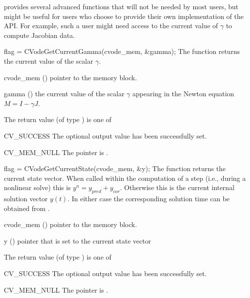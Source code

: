 {\cvode} provides several advanced functions that will not be needed by most
users, but might be useful for users who choose to provide their own
implementation of the  API. For example, such a user
might need access to the current value of $\gamma$ to compute Jacobian data.

{
  flag = CVodeGetCurrentGamma(cvode\_mem, \&gamma);
}
{
  The function  returns the current
  value of the scalar $\gamma$.
}
{
  \begin{args}
  \item[cvode\_mem] ()
    pointer to the {\cvode} memory block.
  \item[gamma] ()
      the current value of the scalar $\gamma$ appearing in the
      Newton equation $M = I - \gamma J$.
  \end{args}
}
{
  The return value  (of type ) is one of
  \begin{args}
  \item[CV\_SUCCESS]
    The optional output value has been successfully set.
  \item[CV\_MEM\_NULL]
    The  pointer is .
  \end{args}
}
{}
{
  flag = CVodeGetCurrentState(cvode\_mem, \&y);
}
{
  The function  returns the current state vector. When
  called within the computation of a step (i.e., during a nonlinear solve) this
  is $y^n = y_{pred} + y_{cor}$. Otherwise this is the current internal solution
  vector $y(t)$. In either case the corresponding solution time can be obtained
  from .
}
{
  \begin{args}
  \item[cvode\_mem] ()
    pointer to the {\cvode} memory block.
  \item[y] ()
    pointer that is set to the current state vector
  \end{args}
}
{
  The return value  (of type ) is one of
  \begin{args}
  \item[CV\_SUCCESS]
    The optional output value has been successfully set.
  \item[CV\_MEM\_NULL]
    The  pointer is .
  \end{args}
}
{}
